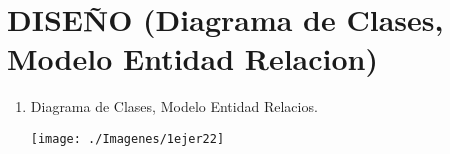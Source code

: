 \section{ DISEÑO (Diagrama de Clases, Modelo Entidad Relacion)} 

\begin{enumerate}[1.]
	\item Diagrama de Clases, Modelo Entidad Relacios.
    


	\begin{center}
	\texttt{[image: ./Imagenes/1ejer22]} 
	\end{center}

\end{enumerate} 